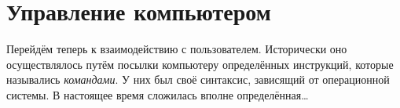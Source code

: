 \section{Управление компьютером}\label{base:introduction:control}
Перейдём теперь к взаимодействию с пользователем. Исторически оно осуществлялось путём посылки компьютеру определённых инструкций, которые назывались \emph{командами}. У них был своё синтаксис, зависящий от операционной системы. В настоящее время сложилась вполне определённая\dots